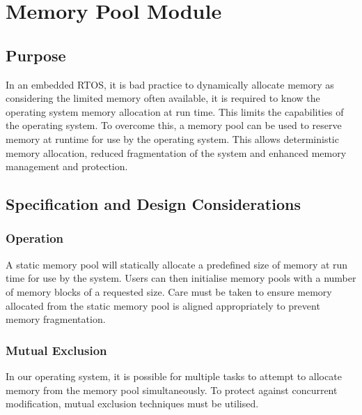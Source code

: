 \section{Memory Pool Module}
\subsection{Purpose}
In an embedded RTOS, it is bad practice to dynamically allocate memory as considering the limited memory often available, it is required to know the operating system memory allocation at run time. This limits the capabilities of the operating system. To overcome this, a memory pool can be used to reserve memory at runtime for use by the operating system. This allows deterministic memory allocation, reduced fragmentation of the system and enhanced memory management and protection.

\subsection{Specification and Design Considerations}
\subsubsection{Operation}
A static memory pool will statically allocate a predefined size of memory at run time for use by the system. Users can then initialise memory pools with a number of memory blocks of a requested size. Care must be taken to ensure memory allocated from the static memory pool is aligned appropriately to prevent memory fragmentation.

\subsubsection{Mutual Exclusion}
In our operating system, it is possible for multiple tasks to attempt to allocate memory from the memory pool simultaneously. To protect against concurrent modification, mutual exclusion techniques must be utilised.

